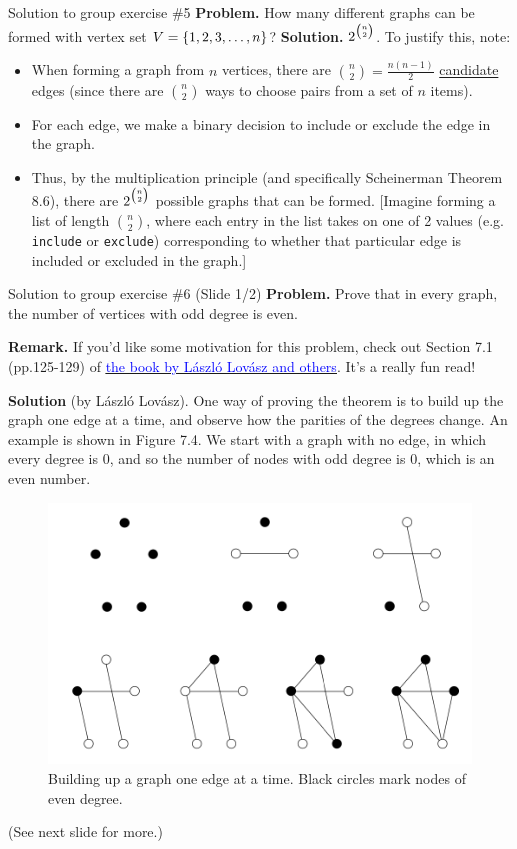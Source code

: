 \documentclass[10pt]{beamer}
\begin{document}
\begin{frame}{Solution to group exercise \#5}
\small 
\textbf{Problem.} How many different graphs can be formed with vertex set $V=\{ {1,2,3,\hdots,n} \}$?
\vfill 
\textbf{Solution.}  $2^{\raisebox{0.3ex}{\scriptsize$\binom{n}{2}$}}$.   To justify this, note:
\begin{itemize}
\item When forming a graph from $n$ vertices, there are $\binom{n}{2}=\frac{n(n-1)}{2}$ \underline{candidate} edges (since there are $\binom{n}{2}$ ways to choose pairs from a set of $n$ items).
\item  For each edge, we make a binary decision to include or exclude the edge in the graph.
\item  Thus, by the multiplication principle (and specifically Scheinerman Theorem 8.6), there are $2^{\raisebox{0.3ex}{\scriptsize$\binom{n}{2}$}}$ possible graphs that can be formed.  [Imagine forming a list of length $\binom{n}{2}$, where each entry in the list takes on one of 2 values (e.g. \texttt{include} or \texttt{exclude}) corresponding to whether that particular edge is included or excluded in the graph.]
\end{itemize}

	
\end{frame}

\begin{frame}{Solution to group exercise \#6 (Slide 1/2)} 
\footnotesize 
\textbf{Problem.} Prove that in every graph, the number of vertices with odd degree is even. 

\vfill 
\textbf{Remark.} If you'd like some motivation for this problem, check out Section 7.1 (pp.125-129) of \href{https://file.fouladi.ir/courses/discmath/books/Springer.Verlag.Discrete.Mathematics.Elementary.and.Beyond.ebook-TLFeBOOK.pdf}{\underline{\textcolor{blue}{the book by L\'aszl\'o Lov\'asz and others}}}.  It's a really fun read!

\vfill 

\textbf{Solution} (by L\'aszl\'o Lov\'asz).  One way of proving the theorem is to build up the graph one edge at a time, and observe how the parities of the degrees change. An example is shown in Figure 7.4. We start with a graph with no edge, in which every degree is 0, and so the number of nodes with odd degree is 0, which is an even number.
 
\begin{figure}
\includegraphics[width=.4\linewidth]{images/number_of_nodes_with_odd_degree_is_even.png}	
\caption{Building up a graph one edge at a time. Black circles mark nodes of even degree.}
\end{figure}

\hfill (See next slide for more.)

\end{frame}
\end{document}
